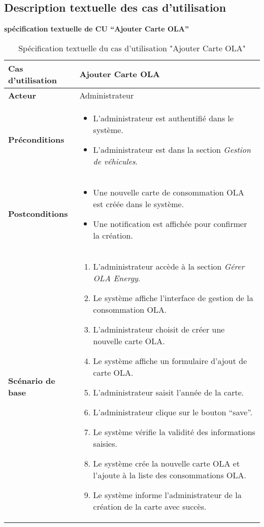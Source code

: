 \documentclass[a4paper,11pt]{report}
\begin{document}
\newpage
\subsection{Description textuelle des cas d'utilisation}
\textbf{spécification textuelle de CU “Ajouter Carte OLA”}
\begin{table}[H]
  \centering
  \renewcommand{\arraystretch}{1.5}
  \caption{Spécification textuelle du cas d'utilisation "Ajouter Carte OLA"}
  \begin{tabularx}{\textwidth}{|l|X|}
    \hline
    \textbf{Cas d'utilisation} & Ajouter Carte OLA \\ \hline
    \textbf{Acteur} & Administrateur \\ \hline
    \textbf{Préconditions} & 
    \begin{itemize}
      \item L’administrateur est authentifié dans le système.
      \item L’administrateur est dans la section \textit{Gestion de véhicules}.
    \end{itemize} \\ \hline
    \textbf{Postconditions} & 
    \begin{itemize}
      \item Une nouvelle carte de consommation OLA est créée dans le système.
      \item Une notification est affichée pour confirmer la création.
    \end{itemize} \\ \hline
    \textbf{Scénario de base} & 
    \begin{enumerate}
      \item L’administrateur accède à la section \textit{Gérer OLA Energy}.
      \item Le système affiche l’interface de gestion de la consommation OLA.
      \item L’administrateur choisit de créer une nouvelle carte OLA.
      \item Le système affiche un formulaire d’ajout de carte OLA.
      \item L’administrateur saisit l’année de la carte.
      \item L’administrateur clique sur le bouton “save”.
      \item Le système vérifie la validité des informations saisies.
      \item Le système crée la nouvelle carte OLA et l’ajoute à la liste des consommations OLA.
      \item Le système informe l’administrateur de la création de la carte avec succès.

\end{enumerate}
\end{tabularx}
\end{table}
\end{document}
